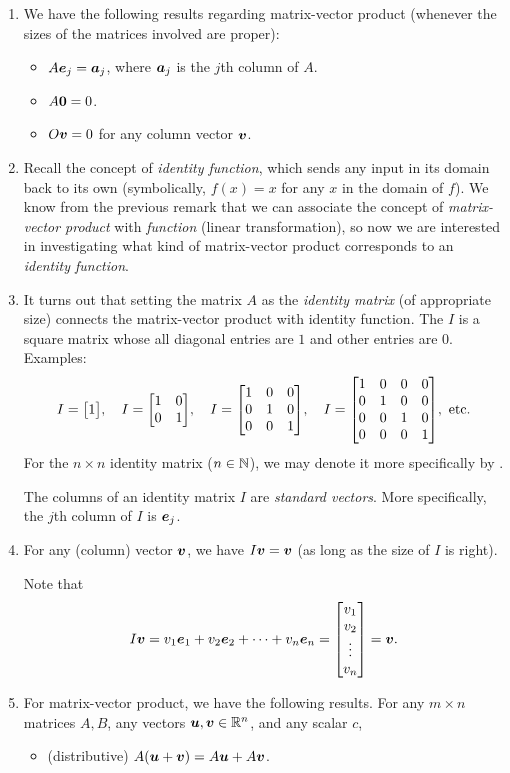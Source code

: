 \begin{enumerate}
\item We have the following results regarding matrix-vector product (whenever
the sizes of the matrices involved are proper):
\begin{itemize}
\item \(A\vb*{e}_{j}=\vb*{a}_{j}\), where \(\vb*{a}_{j}\) is the \(j\)th column of \(A\).
\item \(A\vb*{0}=0\).
\item \(O\vb*{v}=0\) for any column vector \(\vb*{v}\).
\end{itemize}

\item Recall the concept of \emph{identity function}, which sends any input in
its domain back to its own (symbolically, \(f(x)=x\) for any \(x\) in the
domain of \(f\)). We know from the previous remark that we can associate the
concept of \emph{matrix-vector product} with \emph{function} (linear
transformation), so now we are interested in investigating what kind of
matrix-vector product corresponds to an \emph{identity function}.

\item It turns out that setting the matrix \(A\) as the \emph{identity matrix}
(of appropriate size) connects the matrix-vector product with identity
function. The  \(I\) is a square matrix whose all diagonal
entries are \(1\) and other entries are \(0\). Examples:
\[
I=\mqty[\dmat[0]{1}],\quad
I=\mqty[\dmat[0]{1,1}],\quad
I=\mqty[\dmat[0]{1,1,1}],\quad
I=\mqty[\dmat[0]{1,1,1,1}],\text{ etc.}
\]
For the \(n\times n\) identity matrix (\(n\in\mathbb{N}\)), we may denote it more
specifically by .

\begin{note}
The columns of an identity matrix \(I\) are \emph{standard vectors}. More
specifically, the \(j\)th column of \(I\) is \(\vb*{e}_{j}\).
\end{note}
\item \label{it:identity-matrix-vec-mult}
For any (column) vector \(\vb*{v}\), we have \(I\vb*{v}=\vb*{v}\) (as
long as the size of \(I\) is right).

\begin{pf}
Note that
\[
I\vect{v}=v_{1}\vect{e}_{1}+v_2\vect{e}_{2}+\dotsb+v_{n}\vect{e}_{n}
=\mqty[v_1\\v_2\\\vdots\\v_n]=\vect{v}.
\]
\end{pf}
\item \label{it:matrix-vec-dist-asso}
For matrix-vector product, we have the following results.  For any
\(m\times n\) matrices \(A,B\), any vectors \(\vb*{u},\vb*{v}\in\mathbb{R}^n\), and
any scalar \(c\),
\begin{itemize}
\item (distributive) \(A(\vb*{u}+\vb*{v})=A\vb*{u}+A\vb*{v}\).


\end{itemize}
\end{enumerate}
